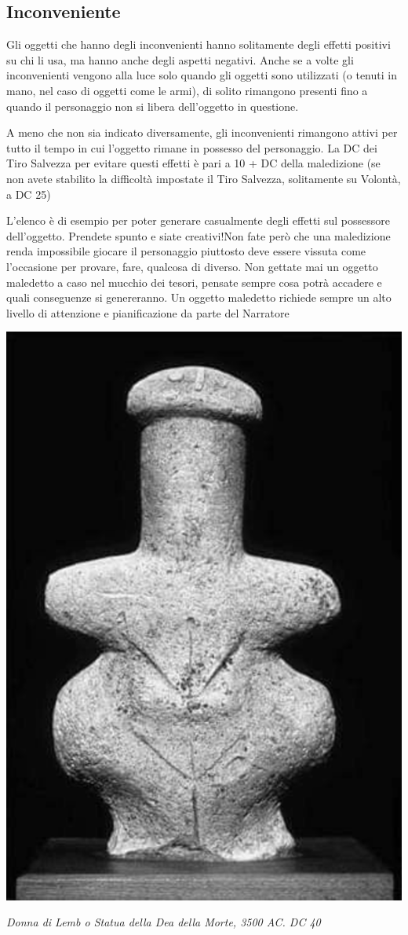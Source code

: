 \begin{multicols}{2}
\subsection{Inconveniente}

Gli oggetti che hanno degli inconvenienti hanno solitamente degli effetti positivi su chi li usa, ma hanno anche degli aspetti negativi. Anche se a volte gli inconvenienti vengono alla luce solo quando gli oggetti sono utilizzati (o tenuti in mano, nel caso di oggetti come le armi), di solito rimangono presenti fino a quando il personaggio non si libera dell'oggetto in questione.

A meno che non sia indicato diversamente, gli inconvenienti rimangono attivi per tutto il tempo in cui l'oggetto rimane in possesso del personaggio. La DC dei Tiro Salvezza per evitare questi effetti è pari a 10 + DC della maledizione (se non avete stabilito la difficoltà impostate il Tiro Salvezza, solitamente su Volontà, a DC 25)

\medskip

\begin{changemargin}{0.3cm}{0.3cm}\begin{narratore}L'elenco è di esempio per poter generare casualmente degli effetti sul possessore dell'oggetto. Prendete spunto e siate creativi!Non fate però che una maledizione renda impossibile giocare il personaggio piuttosto deve essere vissuta come l'occasione per provare, fare, qualcosa di diverso. Non gettate mai un oggetto maledetto a caso nel mucchio dei tesori, pensate sempre cosa potrà accadere e quali conseguenze si genereranno. Un oggetto maledetto richiede sempre un alto livello di attenzione e pianificazione da parte del Narratore\end{narratore}\end{changemargin}

\medskip

\end{multicols}

\vfill

\begin{center}
\includegraphics[width=0.35\linewidth]{immagini/donnalemb.png}

\emph{Donna di Lemb o Statua della Dea della Morte, 3500 AC. DC 40}
\end{center}



